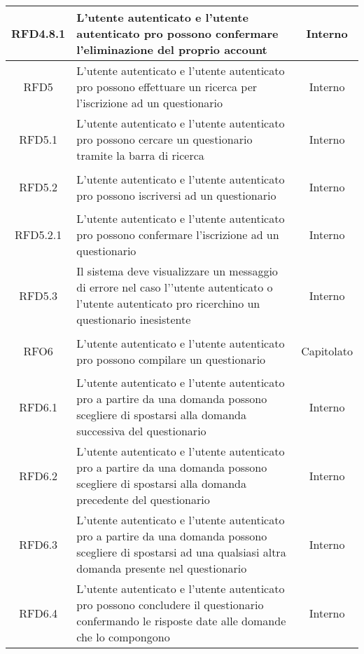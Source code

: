 \begin{longtable}{|c|>{\centering}m{7cm}|c|}
\hypertarget{RFD4.8.1}{RFD4.8.1} & L’utente autenticato e l’utente autenticato pro possono confermare l’eliminazione del proprio account & Interno
\\ \hline

\hypertarget{RFD5}{RFD5} & L’utente autenticato e l’utente autenticato pro possono effettuare un ricerca per l’iscrizione ad un questionario & Interno
\\ \hline

\hypertarget{RFD5.1}{RFD5.1} & L’utente autenticato e l’utente autenticato pro possono cercare un questionario tramite la barra di ricerca & Interno
\\ \hline

\hypertarget{RFD5.2}{RFD5.2} & L’utente autenticato e l’utente autenticato pro possono iscriversi ad un questionario & Interno
\\ \hline

\hypertarget{RFD5.2.1}{RFD5.2.1} & L’utente autenticato e l’utente autenticato pro possono confermare l’iscrizione ad un questionario & Interno
\\ \hline

\hypertarget{RFD5.3}{RFD5.3} & Il sistema deve visualizzare un messaggio di errore nel caso l’’utente autenticato o l’utente autenticato pro ricerchino un questionario inesistente  & Interno
\\ \hline

\hypertarget{RFO6}{RFO6} & L’utente autenticato e l’utente autenticato pro possono compilare un questionario & Capitolato
\\ \hline

\hypertarget{RFD6.1}{RFD6.1} & L’utente autenticato e l’utente autenticato pro a partire da una domanda possono scegliere di spostarsi alla domanda successiva del questionario  & Interno
\\ \hline

\hypertarget{RFD6.2}{RFD6.2} & L’utente autenticato e l’utente autenticato pro a partire da una domanda possono scegliere di spostarsi alla domanda precedente del questionario & Interno
\\ \hline

\hypertarget{RFD6.3}{RFD6.3} & L’utente autenticato e l’utente autenticato pro a partire da una domanda possono scegliere di spostarsi ad una qualsiasi altra domanda presente nel questionario & Interno
\\ \hline

\hypertarget{RFD6.4}{RFD6.4} & L’utente autenticato e l’utente autenticato pro possono concludere il questionario confermando le risposte date alle domande che lo compongono  & Interno
\\ \hline


\end{longtable}
